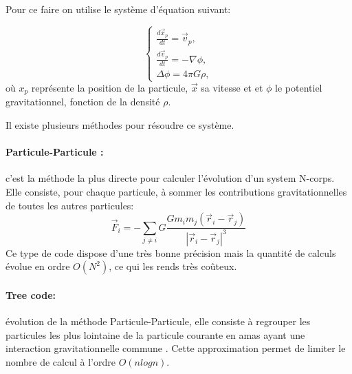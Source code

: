 Pour ce faire on utilise le système d'équation suivant:

\begin{equation}
\begin{cases}
\frac{d\vec{x}_p}{dt} = \vec{v}_p, \\
\frac{d\vec{v}_p}{dt} = -\nabla \phi , \\
\Delta \phi= 4\pi G \rho,
\end{cases}
\label{eq:Ncorps}
\end{equation}
où ${x}_p$ représente la position de la particule, $\vec{x}$ sa vitesse et et $\phi$ le potentiel gravitationnel, fonction de la densité $\rho$.

Il existe plusieurs méthodes pour résoudre ce système.
\paragraph{Particule-Particule : } c'est la méthode la plus directe pour calculer l'évolution d'un system N-corps. 
Elle consiste, pour chaque particule, à sommer les contributions gravitationnelles de toutes les autres particules:
\begin{equation}
\vec{F}_i=-\sum_{j\neq i} G \frac{G m_i m_j(\vec{r}_i - \vec{r}_j) }{ |\vec{r}_i - \vec{r}_j |^3}
\end{equation}
Ce type de code dispose d'une très bonne précision mais la quantité de calculs évolue en ordre $O(N^2)$, ce qui les rends très coûteux.

\paragraph{Tree code: } évolution de la méthode Particule-Particule, elle consiste à regrouper les particules les plus lointaine de la particule courante en amas ayant une interaction gravitationnelle commune \citep{1986Natur.324..446B}.
Cette approximation permet de limiter le nombre de calcul à l'ordre $O(n log n)$. %

